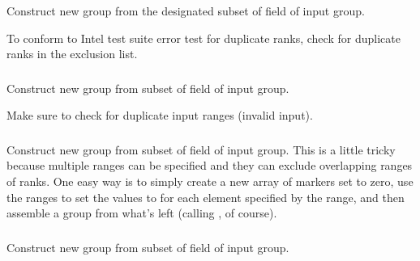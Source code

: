 \documentclass{article}
\begin{document}
\subsubsection{}
\begin{adi3}
  Construct new group from the designated subset of
   field of input group.

  To conform to Intel test suite error test for duplicate ranks, check for 
  duplicate ranks in the exclusion list.
\end{adi3}

\subsubsection{}
\begin{adi3}
  Construct new group from subset of  field of
  input group.

  Make sure to check for duplicate input ranges (invalid input).
\end{adi3}

\subsubsection{}
\begin{adi3}
  Construct new group from subset of  field of
  input group.  This is a little tricky because multiple ranges can be
  specified and they can exclude overlapping ranges of ranks.  One easy way is
  to simply create a new array of markers set to zero, use the ranges to set
  the values to  for each element specified by the range, and
  then assemble 
  a group from what's left (calling , of course).
\end{adi3}

\subsubsection{}
\begin{adi3}
  Construct new group from subset of  field of
  input group.
\end{adi3}

\subsubsection{}
\end{document}
